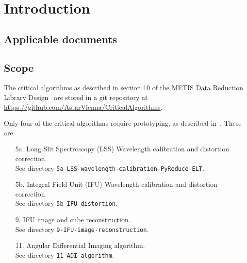 \documentclass[11pt,oneside,a4paper]{article}
\newcommand{\CODE}[1]{\lstinline[]!#1!}
\begin{document}




\section{Introduction}
\label{sec:intro}

\subsection{Applicable documents}
\label{ssec:ad}
\begin{refcontext}[labelprefix=AD]
  \printbibliography[keyword=applicable, heading=none]
\end{refcontext}

\subsection{Scope}
\label{ssec:scope}
The critical algorithms as described in section 10 of the METIS Data Reduction Library Design~\cite{DRLD} are stored in a git repository at \url{https://github.com/AstarVienna/CriticalAlgorithms}.

Only four of the critical algorithms require prototyping, as described in~\cite{DRLD}.
These are
\begin{enumerate}
    \item[5a.] Long Slit Spectroscopy (LSS) Wavelength calibration and distortion correction.\\
        See directory \CODE{5a-LSS-wavelength-calibration-PyReduce-ELT}.
    \item[5b.] Integral Field Unit (IFU) Wavelength calibration and distortion correction.\\
        See directory \CODE{5b-IFU-distortion}.
    \item[9.] IFU image and cube reconstruction.\\
        See directory \CODE{9-IFU-image-reconstruction}.
    \item[11.] Angular Differential Imaging algorithm.\\
        See directory \CODE{11-ADI-algorithm}.
\end{enumerate}
\end{document}
